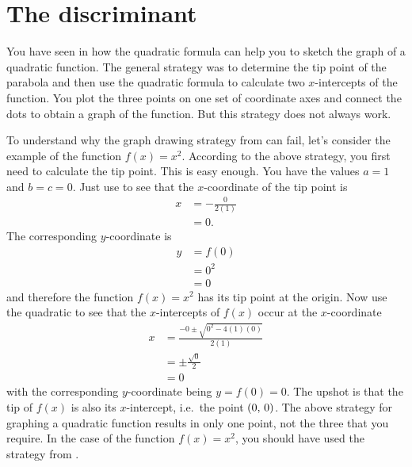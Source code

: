 \documentclass[a4paper,oneside,12pt]{article}
\begin{document}

\section{The discriminant}

You have seen in  how the quadratic
formula can help you to sketch the graph of a quadratic function.  The
general strategy was to determine the tip point of the parabola and
then use the quadratic formula to calculate two $x$-intercepts of the
function.  You plot the three points on one set of coordinate axes and
connect the dots to obtain a graph of the function.  But this strategy
does not always work.

To understand why the graph drawing strategy
from  can fail, let's consider the
example of the function $f(x) = x^2$.  According to the above
strategy, you first need to calculate the tip point.  This is easy
enough.  You have the values $a = 1$ and $b = c = 0$.  Just use
 to see that the
$x$-coordinate of the tip point is
\begin{align*}
x
&=
-\frac{0}{2(1)} \\[4pt]
&=
0.
\end{align*}
The corresponding $y$-coordinate is
\begin{align*}
y
&=
f(0) \\[4pt]
&=
0^2 \\[4pt]
&=
0
\end{align*}
and therefore the function $f(x) = x^2$ has its tip point at the
origin.  Now use the quadratic  to see
that the $x$-intercepts of $f(x)$ occur at the $x$-coordinate
\begin{align*}
x
&=
\frac{
  -0 \pm \sqrt{0^2 - 4(1)(0)}
}{
  2(1)
} \\[4pt]
&=
\pm
\frac{
  \sqrt{0}
}{
  2
} \\[4pt]
&=
0
\end{align*}
with the corresponding $y$-coordinate being $y = f(0) = 0$.  The
upshot is that the tip of $f(x)$ is also its $x$-intercept, i.e.~the
point $\left\lparen{0},\, {0}\right\rparen$.  The above strategy for graphing a quadratic
function results in only one point, not the three that you require.
In the case of the function $f(x) = x^2$, you should have used the
strategy from .
\end{document}

